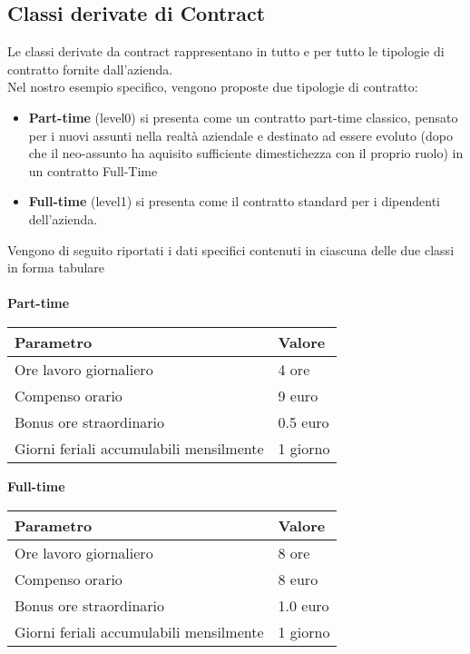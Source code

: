 \documentclass[a4paper,10pt]{article}
\begin{document}
\subsection{Classi derivate di Contract}
Le classi derivate da contract rappresentano in tutto e per tutto le tipologie di contratto fornite dall'azienda.\\
Nel nostro esempio specifico, vengono proposte due tipologie di contratto:\\
\begin{itemize}
\item \textbf{Part-time} (level0) si presenta come un contratto part-time classico, pensato per i nuovi assunti nella realtà aziendale e destinato ad essere evoluto (dopo che il neo-assunto ha aquisito sufficiente dimestichezza con il proprio ruolo) in un contratto Full-Time
\item \textbf{Full-time} (level1) si presenta come il contratto standard per i dipendenti dell'azienda. 
\end{itemize}
Vengono di seguito riportati i dati specifici contenuti in ciascuna delle due classi in forma tabulare\\ \\

\textbf{Part-time} \\

\begin{tabular}{| l | l |}
\hline
\textbf{Parametro} & \textbf{Valore} \\
\hline
Ore lavoro giornaliero & 4 ore \\
\hline
Compenso orario & 9 euro \\
\hline
Bonus ore straordinario & 0.5 euro \\
\hline
Giorni feriali accumulabili mensilmente & 1 giorno \\ 
\hline
\end{tabular}

\newpage

\textbf{Full-time} \\ 

\begin{tabular}{| l | l |}
\hline
\textbf{Parametro} & \textbf{Valore} \\
\hline
Ore lavoro giornaliero & 8 ore \\
\hline
Compenso orario & 8 euro \\
\hline
Bonus ore straordinario & 1.0 euro \\
\hline
Giorni feriali accumulabili mensilmente & 1 giorno \\ 
\hline
\end{tabular} \\ \\
\end{document}
